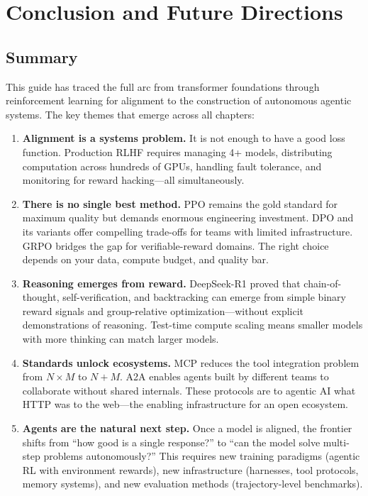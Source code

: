 \chapter{Conclusion and Future Directions}
\label{ch:conclusion}

\section{Summary}
\label{summary}

This guide has traced the full arc from transformer foundations through reinforcement learning for alignment to the construction of autonomous agentic systems. The key themes that emerge across all chapters:

\begin{enumerate}
  \item \textbf{Alignment is a systems problem.} It is not enough to have a good loss function. Production RLHF requires managing 4+ models, distributing computation across hundreds of GPUs, handling fault tolerance, and monitoring for reward hacking---all simultaneously.
  \item \textbf{There is no single best method.} PPO remains the gold standard for maximum quality but demands enormous engineering investment. DPO and its variants offer compelling trade-offs for teams with limited infrastructure. GRPO bridges the gap for verifiable-reward domains. The right choice depends on your data, compute budget, and quality bar.
  \item \textbf{Reasoning emerges from reward.} DeepSeek-R1 proved that chain-of-thought, self-verification, and backtracking can emerge from simple binary reward signals and group-relative optimization---without explicit demonstrations of reasoning. Test-time compute scaling means smaller models with more thinking can match larger models.
  \item \textbf{Standards unlock ecosystems.} MCP reduces the tool integration problem from $N \times M$ to $N + M$. A2A enables agents built by different teams to collaborate without shared internals. These protocols are to agentic AI what HTTP was to the web---the enabling infrastructure for an open ecosystem.
  \item \textbf{Agents are the natural next step.} Once a model is aligned, the frontier shifts from ``how good is a single response?'' to ``can the model solve multi-step problems autonomously?'' This requires new training paradigms (agentic RL with environment rewards), new infrastructure (harnesses, tool protocols, memory systems), and new evaluation methods (trajectory-level benchmarks).

\end{enumerate}
